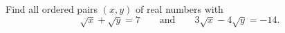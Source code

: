 Find all ordered pairs $(x,y)$ of real numbers with
\[
\sqrt{x}+\sqrt{y}=7\qquad\text{and}\qquad 3\sqrt{x}-4\sqrt{y}=-14 .
\]
